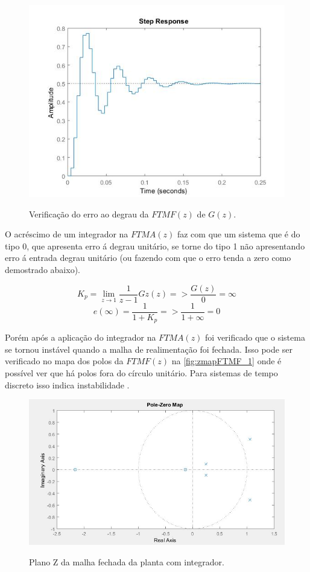 \documentclass[
	article,			%
	11pt,				%
	oneside,			%
	a4paper,			%
	english,			%
	brazil,				%
	sumario=tradicional
	]{abntex2}
\begin{document}
\begin{figure}[htb!]
	\centering
	\caption{Verificação do erro ao degrau da $FTMF(z)$ de $G(z)$.}
	\includegraphics[scale=0.6]{./img/stepErroKp.jpg}
	\label{fig:stepErroKp}
\end{figure}

O acréscimo de um integrador na $FTMA(z)$ faz com que um sistema que é do tipo 0, que apresenta erro á degrau unitário, se torne do tipo 1 não apresentando erro á entrada degrau unitário \cite{Ogata_DTC_1995}(ou fazendo com que o erro tenda a zero como demostrado abaixo).

$$K_p = \lim_{z\to1} \frac{1}{z-1}Gz(z) => \frac{G(z)}{0} = \infty$$ 
$$e(\infty) = \frac{1}{1+K_p} => \frac{1}{1+\infty} = 0$$

\pagebreak

Porém após a aplicação do integrador na $FTMA(z)$ foi verificado que o sistema se tornou instável quando a malha de realimentação foi fechada. 
Isso pode ser verificado no mapa dos polos da $FTMF(z)$ na \autoref{fig:zmapFTMF_1} onde é possível ver que há polos fora do círculo unitário.
Para sistemas de tempo discreto isso indica instabilidade \cite{lathi2014}.

\begin{figure}[htb!]
	\centering
	\caption{Plano Z da malha fechada da planta com integrador.}
	\includegraphics[scale=0.8]{./img/zmapFTMF_1.JPG}
	\label{fig:zmapFTMF_1}
\end{figure}
\end{document}

